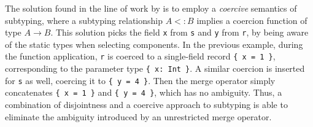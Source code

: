 The solution found in the line of work by \citet{oliveira2016disjoint} is to
employ a \emph{coercive} semantics of subtyping, where a subtyping relationship
$A <: B$ implies a coercion function of type $A \to B$. This solution picks the
field \lstinline{x} from \lstinline{s} and \lstinline{y} from \lstinline{r}, by
being aware of the static types when selecting components. In the previous
example, during the function application, \lstinline{r} is coerced to a
single-field record \lstinline|{ x = 1 }|, corresponding to the parameter type
\lstinline|{ x: Int }|. A similar coercion is inserted for \lstinline{s} as
well, coercing it to \lstinline|{ y = 4 }|. Then the merge operator simply
concatenates \lstinline|{ x = 1 }| and \lstinline|{ y = 4 }|, which has no
ambiguity. Thus, a combination of disjointness and a coercive approach to
subtyping is able to eliminate the ambiguity introduced by an unrestricted merge
operator.

